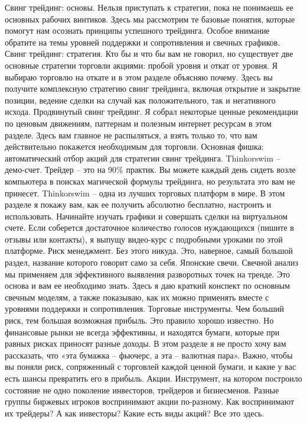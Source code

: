 \documentclass{book}
\begin{document}
Свинг трейдинг: основы. Нельзя приступать к стратегии, пока не понимаешь ее основных рабочих винтиков. Здесь мы рассмотрим те базовые понятия, которые помогут нам осознать принципы успешного трейдинга. Особое внимание обратите на темы уровней поддержки и сопротивления и свечных графиков.
Свинг трейдинг: стратегия. Кто бы и что бы вам не говорил, но существует две основные стратегии торговли акциями: пробой уровня и откат от уровня. Я выбираю торговлю на откате и в этом разделе объясняю почему. Здесь вы получите комплексную стратегию свинг трейдинга, включая открытие и закрытие позиции, ведение сделки на случай как положительного, так и негативного исхода.
Продвинутый свинг трейдинг. Я собрал некоторые ценные рекомендации по ценовым движениям, паттернам и полезным интернет ресурсам в этом разделе. Здесь вам главное не распыляться, а взять только то, что вам действительно покажется необходимым для торговли. Основная фишка: автоматический отбор акций для стратегии свинг трейдинга.
Thinkorswim – демо-счет. Трейдер – это на 90\% практик. Вы можете каждый день сидеть возле компьютера в поисках магической формулы трейдинга, но результата это вам не принесет. Thinkorswim – одна из лучших торговых платформ в мире. В этом разделе я покажу вам, как ее получить абсолютно бесплатно, настроить и использовать. Начинайте изучать графики и совершать сделки на виртуальном счете. Если соберется достаточное количество голосов нуждающихся (пишите в отзывы или контакты), я выпущу видео-курс с подробными уроками по этой платформе.
Риск менеджмент. Без этого никуда. Это, наверное, самый большой раздел, название которого говорит само за себя.
Японские свечи. Свечной анализ мы применяем для эффективного выявления разворотных точек на тренде. Это основа и вам ее необходимо знать. Здесь я даю краткий конспект по основным свечным моделям, а также показываю, как их можно применять вместе с уровнями поддержки и сопротивления.
Торговые инструменты. Чем больший риск, тем большая возможная прибыль. Это правило хорошо известно.  Но финансовые рынки не всегда эффективны, и находятся бумаги, которые при равных рисках приносят разные доходы. В этом разделе я не просто хочу вам рассказать, что «эта бумажка – фьючерс, а эта – валютная пара». Важно, чтобы вы поняли риск, сопряженный с торговлей каждой ценной бумаги, и какие у вас есть шансы превратить его в прибыль.
Акции. Инструмент, на котором построило состояние не одно поколение инвесторов, трейдеров и бизнесменов. Разные группы биржевых игроков воспринимают акции по-разному. Как воспринимают их трейдеры? А как инвесторы? Какие есть виды акций? Все это здесь.
\end{document}
